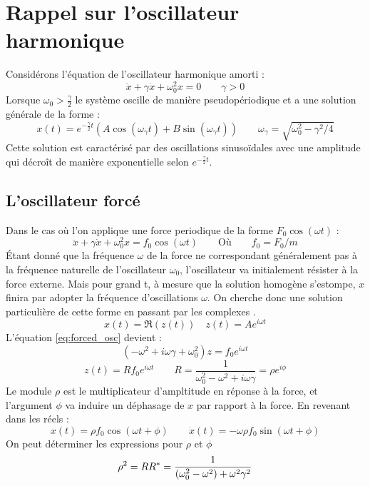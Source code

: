 \chapter{Rappel sur l'oscillateur harmonique}
%
Considérons l'équation de l'oscillateur harmonique amorti :
\begin{dmath}
    \ddot{x} + \gamma\dot{x} + \omega_0^2 x = 0
    \qquad {\gamma > 0}
\end{dmath}   
%
Lorsque $\omega_0 > \frac{\gamma}{2}$ le système oscille de manière pseudopériodique et a une solution générale de la forme :
%
\begin{dmath}
    x(t) = e^{-\frac{\gamma}{2}t}(A\cos(\omega_{\gamma} t) + B\sin(\omega_{\gamma} t))
    \qquad {\omega_{\gamma} = \sqrt{\omega_0^2 - \gamma^2/4}}
\end{dmath}
%
Cette solution est caractérisé par des oscillations sinusoïdales avec une amplitude qui décroît de manière exponentielle selon $e^{-\frac{\gamma}{2} t}$.
%
\section{L'oscillateur forcé}
%
Dans le cas où l’on applique une force periodique de la forme $F_0\cos(\omega t)$ :
%
\begin{equation}
    \ddot{x} + \gamma\dot{x} + \omega_0^2 x = f_0\cos(\omega t)
    \qquad
    \text{Où}
    \qquad
    f_0 = F_0/m
    \label{eq:forced_osc}
\end{equation}
%
Étant donné que la fréquence $\omega$ de la force ne correspondant 
généralement pas à la fréquence naturelle de l'oscillateur $\omega_0$, 
l'oscillateur va initialement résister à la force externe.
Mais pour grand t, à mesure que la solution homogène s'estompe, $x$ finira par adopter la 
fréquence d'oscillations $\omega$. 
On cherche donc une solution particulière de cette forme en passant 
par les complexes \cite{feynman_feynman_nodate}.
%
\begin{equation}
    x(t) = \Re(z(t)) \quad z(t) = Ae^{i\omega t}
\end{equation}
%
L'équation \eqref{eq:forced_osc} devient :
%
\begin{equation}
    (-\omega^2 + i\omega\gamma + \omega_0^2)z = f_0 e^{i\omega t}
\end{equation}
%
\begin{equation}
    z(t) = R f_0 e^{i \omega t} \qquad R = \frac{1}{\omega_0^2 - \omega^2 + i\omega\gamma} = \rho e^{i\phi}
\end{equation}
%
Le module $\rho$ est le multiplicateur d’ampltitude en réponse à la force, et l’argument $\phi$ va induire un déphasage de $x$ par rapport à la force.
%
En revenant dans les réels :
\begin{equation}
    x(t) = \rho f_0 \cos(\omega t + \phi)
    \qquad \dot{x}(t) = -\omega \rho f_0 \sin(\omega t + \phi)
\end{equation}
%
On peut déterminer les expressions pour $\rho$ et $\phi$
%
\begin{dmath}
    \rho^2 = RR^* \\
    = \frac{1}{(\omega_0^2 - \omega^2) + \omega^2\gamma^2}
\end{dmath}

